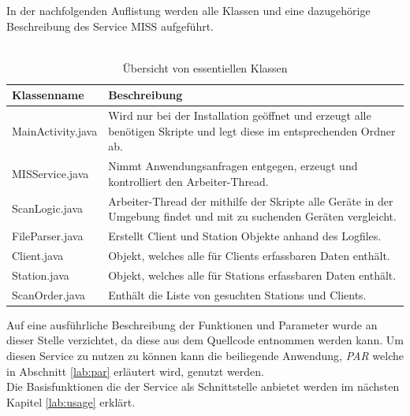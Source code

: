 \documentclass[]{report}
\begin{document}
In der nachfolgenden Auflistung werden alle Klassen und eine dazugehörige Beschreibung des Service MISS aufgeführt.\\ \\
\begin{center}
\begin{table}
\caption{Übersicht von essentiellen Klassen}
  \begin{tabulary}{\textwidth}{l | L}
  \toprule
  Klassenname & Beschreibung \\
  \midrule
  MainActivity.java & Wird nur bei der Installation geöffnet und erzeugt alle benötigen Skripte und legt diese im entsprechenden Ordner ab.\\
  MISService.java & Nimmt Anwendungsanfragen entgegen, erzeugt und kontrolliert den Arbeiter-Thread. \\
  ScanLogic.java & Arbeiter-Thread der mithilfe der Skripte alle Geräte in der Umgebung findet und mit zu suchenden Geräten vergleicht. \\
  FileParser.java & Erstellt Client und Station Objekte anhand des Logfiles. \\
  Client.java & Objekt, welches alle für Clients erfassbaren Daten enthält. \\
  Station.java & Objekt, welches alle für Stations erfassbaren Daten enthält. \\ 
 ScanOrder.java & Enthält die Liste von gesuchten Stations und Clients. \\
  \bottomrule
  \end{tabulary}  
  \end{table}
\end{center}
Auf eine ausführliche Beschreibung der Funktionen und Parameter wurde an dieser Stelle verzichtet, da diese aus dem Quellcode entnommen werden kann. Um diesen Service zu nutzen zu können kann die beiliegende Anwendung, \textit{PAR} welche in Abschnitt \ref{lab:par} erläutert wird, genutzt werden. \\
Die Basisfunktionen die der Service als Schnittstelle anbietet werden im nächsten Kapitel \ref{lab:usage} erklärt. 
\end{document}
